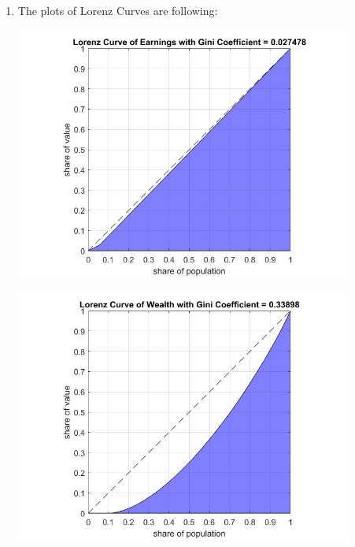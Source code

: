 \documentclass[12pt]{article}
\begin{document}
\begin{enumerate}
\item The plots of Lorenz Curves are following:
\begin{center}
  \includegraphics[width=111.11mm]{LorenzCurveofEarnings.jpg}
\end{center}
\begin{center}
  \includegraphics[width=111.11mm]{LorenzCurveofWealth.jpg}
\end{center}

\end{enumerate}
\end{document}
